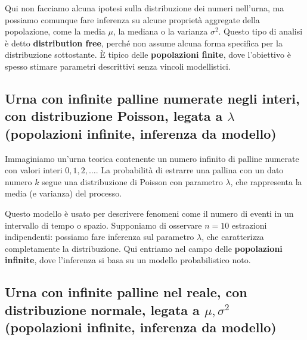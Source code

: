 \documentclass[
  11pt,
]{book}
\theoremstyle{mytheoremstyle}
\theoremstyle{mydefstyle}
\begin{document}
Qui non facciamo alcuna ipotesi sulla distribuzione dei numeri nell'urna, ma possiamo comunque fare inferenza su alcune proprietà aggregate della popolazione, come la media \(\mu\), la mediana o la varianza \(\sigma^2\). Questo tipo di analisi è detto \textbf{distribution free}, perché non assume alcuna forma specifica per la distribuzione sottostante. È tipico delle \textbf{popolazioni finite}, dove l'obiettivo è spesso stimare parametri descrittivi senza vincoli modellistici.

\subsection{\texorpdfstring{Urna con infinite palline numerate negli interi, con distribuzione Poisson, legata a \(\lambda\) (popolazioni infinite, inferenza da modello)}{Urna con infinite palline numerate negli interi, con distribuzione Poisson, legata a \textbackslash lambda (popolazioni infinite, inferenza da modello)}}\label{urna-con-infinite-palline-numerate-negli-interi-con-distribuzione-poisson-legata-a-lambda-popolazioni-infinite-inferenza-da-modello}

Immaginiamo un'urna teorica contenente un numero infinito di palline numerate con valori interi \(0, 1, 2, \dots\). La probabilità di estrarre una pallina con un dato numero \(k\) segue una distribuzione di Poisson con parametro \(\lambda\), che rappresenta la media (e varianza) del processo.

Questo modello è usato per descrivere fenomeni come il numero di eventi in un intervallo di tempo o spazio. Supponiamo di osservare \(n = 10\) estrazioni indipendenti: possiamo fare inferenza sul parametro \(\lambda\), che caratterizza completamente la distribuzione. Qui entriamo nel campo delle \textbf{popolazioni infinite}, dove l'inferenza si basa su un modello probabilistico noto.

\subsection{\texorpdfstring{Urna con infinite palline nel reale, con distribuzione normale, legata a \(\mu, \sigma^2\) (popolazioni infinite, inferenza da modello)}{Urna con infinite palline nel reale, con distribuzione normale, legata a \textbackslash mu, \textbackslash sigma\^{}2 (popolazioni infinite, inferenza da modello)}}\label{urna-con-infinite-palline-nel-reale-con-distribuzione-normale-legata-a-mu-sigma2-popolazioni-infinite-inferenza-da-modello}
\end{document}
